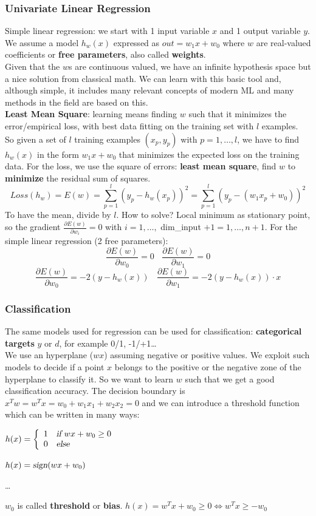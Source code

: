 \documentclass[10pt]{report}
\begin{document}
\subsubsection{Univariate Linear Regression} Simple linear regression: we start with 1 input variable $x$ and 1 output variable $y$. We assume a model $h_w(x)$ expressed as $out = w_1x + w_0$ where $w$ are real-valued coefficients or \textbf{free parameters}, also called \textbf{weights}.\\
Given that the $w$s are continuous valued, we have an infinite hypothesis space but a nice solution from classical math. We can learn with this basic tool and, although simple, it includes many relevant concepts of modern ML and many methods in the field are based on this.\\
\textbf{Least Mean Square}: learning means finding $w$ such that it minimizes the error/empirical loss, with best data fitting on the training set with $l$ examples.\\
So given a set of $l$ training examples $(x_p, y_p)$ with $p = 1,\ldots,l$, we have to find $h_w(x)$ in the form $w_1x + w_0$ that minimizes the expected loss on the training data. For the loss, we use the square of errors: \textbf{least mean square}, find $w$ to \textbf{minimize} the residual sum of squares.
$$Loss(h_w) = E(w) = \sum_{p=1}^l (y_p - h_w(x_p))^2 = \sum_{p=1}^l (y_p - (w_1x_p + w_0))^2$$
To have the mean, divide by $l$. How to solve? Local minimum as stationary point, so the gradient $\frac{\partial E(w)}{\partial w_i} = 0$ with $i = 1,\ldots,$ dim\_input $+1 = 1,\ldots, n+1$. For the simple linear regression (2 free parameters):
$$\frac{\partial E(w)}{\partial w_0} = 0\:\:\:\:\frac{\partial E(w)}{\partial w_1} = 0$$
$$\frac{\partial E(w)}{\partial w_0} = -2(y - h_w(x))\:\:\:\:\frac{\partial E(w)}{\partial w_1} = -2(y - h_w(x))\cdot x$$
\subsubsection{Classification} The same models used for regression can be used for classification: \textbf{categorical targets} $y$ or $d$, for example 0/1, -1/+1\ldots\\
We use an hyperplane ($wx$) assuming negative or positive values. We exploit such models to decide if a point $x$ belongs to the positive or the negative zone of the hyperplane to classify it. So we want to learn $w$ such that we get a good classification accuracy. The decision boundary is $x^Tw = w^Tx = w_0 + w_1x_1 + w_2x_2 = 0$ and we can introduce a threshold function which can be written in many ways: \begin{list}{}{}
	\item $h(x) = \left\{\begin{array}{c l}
	1 & \textsl{if }wx + w_0 \geq 0\\
	0 & \textsl{else}
\end{array}	 \right.$
	\item $h(x) = \textsl{sign}(wx + w_0)$
	\item \ldots
\end{list}
$w_0$ is called \textbf{threshold} or \textbf{bias}. $h(x) = w^Tx + w_0 \geq 0 \Leftrightarrow w^Tx \geq -w_0$
\end{document}
